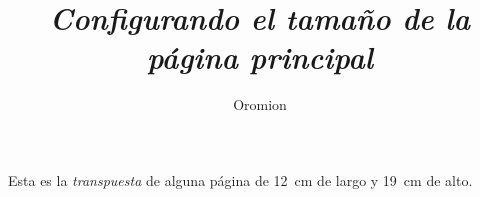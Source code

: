 \documentclass{article}
\title{\textit{Configurando el tamaño de la página principal}}
\author{Oromion}
\begin{document}
\maketitle
Esta es la \emph{transpuesta} de alguna página de \SI{12}{\centi\meter} de largo y \SI{19}{\centi\meter} de alto.
\end{document}
